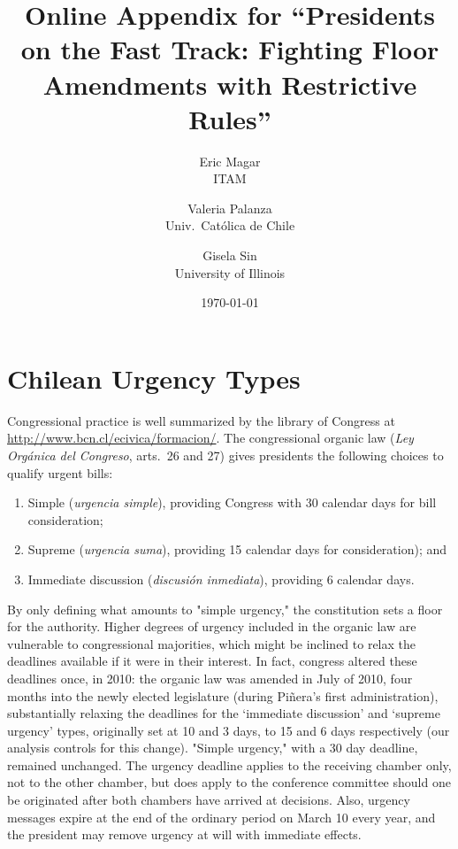 \documentclass[letter,12pt]{article}
\begin{document}
\title{Online Appendix for ``Presidents on the Fast Track: Fighting Floor Amendments with Restrictive Rules''}
\author{Eric Magar \\ ITAM \and
        Valeria Palanza \\ Univ.\ Católica de Chile \and  
        Gisela Sin \\ University of Illinois
}
\date{\today}
\maketitle


\tableofcontents

\doublespacing

\renewcommand\thefigure{A.\arabic{figure}} 
\renewcommand\thetable{A.\arabic{table}} 



\section{Chilean Urgency Types}

Congressional practice is well summarized by the library of Congress at \url{http://www.bcn.cl/ecivica/formacion/}. The congressional organic law (\emph{Ley Orgánica del Congreso}, arts.\ 26 and 27) gives presidents the following choices to qualify urgent bills:

\begin{enumerate}
\item Simple (\emph{urgencia simple}), providing Congress with 30 calendar days for bill consideration;
\item Supreme (\emph{urgencia suma}), providing 15 calendar days for consideration); and
\item Immediate discussion (\emph{discusión inmediata}), providing 6 calendar days.
\end{enumerate}

\noindent By only defining what amounts to "simple urgency," the constitution sets a floor for the authority. Higher degrees of urgency included in the organic law are vulnerable to congressional majorities, which might be inclined to relax the deadlines available if it were in their interest. In fact, congress altered these deadlines once, in 2010: the organic law was amended in July of 2010, four months into the newly elected legislature (during Piñera's first administration), substantially relaxing the deadlines for the `immediate discussion' and `supreme urgency' types, originally set at 10 and 3 days, to 15 and 6 days respectively (our analysis controls for this change). "Simple urgency," with a 30 day deadline, remained unchanged. The urgency deadline applies to the receiving chamber only, not to the other chamber, but does apply to the conference committee should one be originated after both chambers have arrived at decisions. Also, urgency messages expire at the end of the ordinary period on March 10 every year, and the president may remove urgency at will with immediate effects.
 
\end{document}
